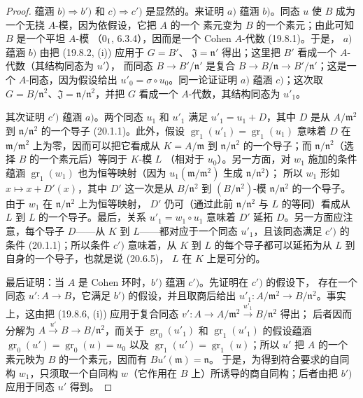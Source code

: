 \begin{proof}
蕴涵 $b)\Rightarrow b')$ 和 $c)\Rightarrow c')$ 是显然的。来证明 $a)$ 蕴涵
$b)$。同态 $u$ 使 $B$ 成为一个无挠 $A$-模，因为依假设，它把 $A$ 的一个
素元变为 $B$ 的一个素元；由此可知 $B$ 是一个平坦 $A$-模
（0$_{\rm I}$, 6.3.4），因而是一个 Cohen $A$-代数 (19.8.1)。于是，
$a)$ 蕴涵 $b)$ 由把 (19.8.2, (i)) 应用于 $G=B'$、
$\mathfrak J=\mathfrak n'$ 得出；这里把 $B'$ 看成一个 $A$-代数（其结构同态为 $u'$），
而同态 $B\to B'/\mathfrak n'$ 是复合
$B\to B/\mathfrak n\to B'/\mathfrak n'$；这是一个 $A$-同态，因为假设给出
$u'_0=\sigma\circ u_0$。同一论证证明 $a)$ 蕴涵 $c)$；这次取
$G=B/\mathfrak n^2$、$\mathfrak J=\mathfrak n/\mathfrak n^2$，并把
$G$ 看成一个 $A$-代数，其结构同态为 $u'_1$。

其次证明 $c')$ 蕴涵 $a)$。两个同态 $u_1$ 和 $u'_1$ 满足
$u'_1=u_1+D$，其中 $D$ 是从 $A/\mathfrak m^2$ 到
$\mathfrak n/\mathfrak n^2$ 的一个导子 (20.1.1)。此外，假设
$\operatorname{gr}_1(u'_1)=\operatorname{gr}_1(u_1)$ 意味着 $D$ 在
$\mathfrak m/\mathfrak m^2$ 上为零，因而可以把它看成从
$K=A/\mathfrak m$ 到 $\mathfrak n/\mathfrak n^2$ 的一个导子；而
$\mathfrak n/\mathfrak n^2$（选择 $B$ 的一个素元后）等同于 $K$-模 $L$
（相对于 $u_0$）。另一方面，对 $w_1$ 施加的条件蕴涵
$\operatorname{gr}_1(w_1)$ 也为恒等映射（因为
$u_1(\mathfrak m/\mathfrak m^2)$ 生成 $\mathfrak n/\mathfrak n^2$）；
所以 $w_1$ 形如 $x\mapsto x+D'(x)$，其中 $D'$ 这一次是从
$B/\mathfrak n^2$ 到 $(B/\mathfrak n^2)$-模 $\mathfrak n/\mathfrak n^2$
的一个导子。由于 $w_1$ 在 $\mathfrak n/\mathfrak n^2$ 上为恒等映射，
$D'$ 仍可（通过此前 $\mathfrak n/\mathfrak n^2$ 与 $L$ 的等同）看成从
$L$ 到 $L$ 的一个导子。最后，关系 $u'_1=w_1\circ u_1$ 意味着 $D'$ 延拓
$D$。另一方面应注意，每个导子 $D$——从 $K$ 到 $L$——都对应于一个同态
$u'_1$，且该同态满足 $c')$ 的条件 (20.1.1)；所以条件 $c')$ 意味着，从 $K$ 到 $L$
的每个导子都可以延拓为从 $L$ 到自身的一个导子，也就是说 (20.6.5)，
$L$ 在 $K$ 上是可分的。

最后证明：当 $A$ 是 Cohen 环时，$b')$ 蕴涵 $c')$。先证明在 $c')$ 的假设下，
存在一个同态 $u':A\to B$，它满足 $b')$ 的假设，并且取商后给出
$u'_1:A/\mathfrak m^2\to B/\mathfrak n^2$。事实上，这由把 (19.8.6, (i))
应用于复合同态
$v':A\to A/\mathfrak m^2\xrightarrow{u'_1}B/\mathfrak n^2$
得出；
后者因而分解为 $A\xrightarrow{u'}B\to B/\mathfrak n^2$，而关于
$\operatorname{gr}_0(u'_1)$ 和 $\operatorname{gr}_1(u'_1)$ 的假设蕴涵
$\operatorname{gr}_0(u')=\operatorname{gr}_0(u)=u_0$ 以及
$\operatorname{gr}_1(u')=\operatorname{gr}_1(u)$；所以 $u'$ 把 $A$ 的一个
素元映为 $B$ 的一个素元，因而有 $Bu'(\mathfrak m)=\mathfrak n$。
于是，为得到符合要求的自同构 $w_1$，只须取一个自同构 $w$（它作用在 $B$
上）所诱导的商自同构；后者由把 $b')$ 应用于同态 $u'$ 得到。
\end{proof}
